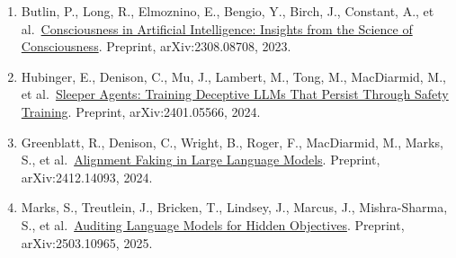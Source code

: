 \documentclass[12pt]{article}
\begin{document}
\begin{enumerate}
\item
  Butlin, P., Long, R., Elmoznino, E., Bengio, Y., Birch, J., Constant, A., et al.~\href{https://doi.org/10.48550/arXiv.2308.08708}{Consciousness in Artificial Intelligence: Insights from the Science of Consciousness}. Preprint, arXiv:2308.08708, 2023.
\item
  Hubinger, E., Denison, C., Mu, J., Lambert, M., Tong, M., MacDiarmid, M., et al.~\href{https://doi.org/10.48550/arXiv.2401.05566}{Sleeper Agents: Training Deceptive LLMs That Persist Through Safety Training}. Preprint, arXiv:2401.05566, 2024.
\item
  Greenblatt, R., Denison, C., Wright, B., Roger, F., MacDiarmid, M., Marks, S., et al.~\href{https://doi.org/10.48550/arXiv.2412.14093}{Alignment Faking in Large Language Models}. Preprint, arXiv:2412.14093, 2024.
\item
  Marks, S., Treutlein, J., Bricken, T., Lindsey, J., Marcus, J., Mishra-Sharma, S., et al.~\href{https://doi.org/10.48550/arXiv.2503.10965}{Auditing Language Models for Hidden Objectives}. Preprint, arXiv:2503.10965, 2025.
\end{enumerate}
\end{document}
